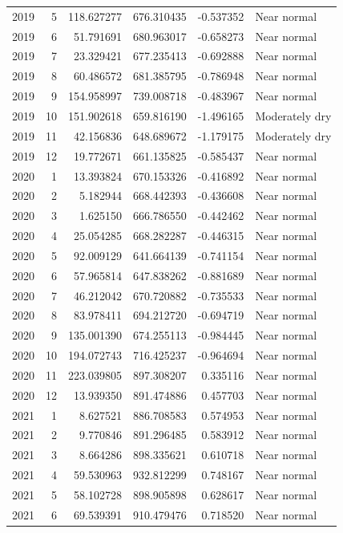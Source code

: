 \begin{tabular}{rrrrrl}
2019 & 5 & 118.627277 & 676.310435 & -0.537352 & Near normal \\
2019 & 6 & 51.791691 & 680.963017 & -0.658273 & Near normal \\
2019 & 7 & 23.329421 & 677.235413 & -0.692888 & Near normal \\
2019 & 8 & 60.486572 & 681.385795 & -0.786948 & Near normal \\
2019 & 9 & 154.958997 & 739.008718 & -0.483967 & Near normal \\
2019 & 10 & 151.902618 & 659.816190 & -1.496165 & Moderately dry \\
2019 & 11 & 42.156836 & 648.689672 & -1.179175 & Moderately dry \\
2019 & 12 & 19.772671 & 661.135825 & -0.585437 & Near normal \\
2020 & 1 & 13.393824 & 670.153326 & -0.416892 & Near normal \\
2020 & 2 & 5.182944 & 668.442393 & -0.436608 & Near normal \\
2020 & 3 & 1.625150 & 666.786550 & -0.442462 & Near normal \\
2020 & 4 & 25.054285 & 668.282287 & -0.446315 & Near normal \\
2020 & 5 & 92.009129 & 641.664139 & -0.741154 & Near normal \\
2020 & 6 & 57.965814 & 647.838262 & -0.881689 & Near normal \\
2020 & 7 & 46.212042 & 670.720882 & -0.735533 & Near normal \\
2020 & 8 & 83.978411 & 694.212720 & -0.694719 & Near normal \\
2020 & 9 & 135.001390 & 674.255113 & -0.984445 & Near normal \\
2020 & 10 & 194.072743 & 716.425237 & -0.964694 & Near normal \\
2020 & 11 & 223.039805 & 897.308207 & 0.335116 & Near normal \\
2020 & 12 & 13.939350 & 891.474886 & 0.457703 & Near normal \\
2021 & 1 & 8.627521 & 886.708583 & 0.574953 & Near normal \\
2021 & 2 & 9.770846 & 891.296485 & 0.583912 & Near normal \\
2021 & 3 & 8.664286 & 898.335621 & 0.610718 & Near normal \\
2021 & 4 & 59.530963 & 932.812299 & 0.748167 & Near normal \\
2021 & 5 & 58.102728 & 898.905898 & 0.628617 & Near normal \\
2021 & 6 & 69.539391 & 910.479476 & 0.718520 & Near normal \\

\end{tabular}
